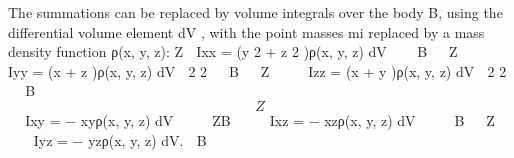 \documentclass[12pt,a4paper]{article}
\begin{document}
The summations can be replaced by volume integrals over the body B, using the
differential volume element dV , with the point masses mi replaced by a mass
density function ρ(x, y, z):
                                Z                            
                       Ixx =       (y 2 + z 2 )ρ(x, y, z) dV 
                                                             
                                                             
                                 B                           
                                                             
                                Z                            
                                                             
                                                             
                                                             
                       Iyy =       (x + z )ρ(x, y, z) dV 
                                      2     2
                                                             
                                                             
                                 B
                                                             
                                                             
                                Z                            
                                                             
                                                             
                                                             
                       Izz =       (x + y )ρ(x, y, z) dV 
                                      2     2                
                                                             
                                 B
\begin{equation}
Z
\label{eq:8.24}
\end{equation}
                                                             
                                                             
                       Ixy = − xyρ(x, y, z) dV               
                                                             
                                                             
                                                             
                                  ZB                         
                                                             
                                                             
                                                             
                       Ixz = − xzρ(x, y, z) dV               
                                                             
                                                             
                                                             
                                    B                        
                                                             
                                  Z                          
                                                             
                                                             
                                                             
                       Iyz = − yzρ(x, y, z) dV.              
                                              B
\end{document}
